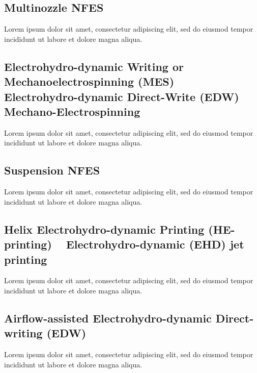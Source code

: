 \documentclass[5p,,preprint,12pt,twocolumn]{elsarticle}
\begin{document}
\subsection{Multinozzle NFES \unskip~\protect\cite{527120:11974322,527120:11974323,527120:11974324}}Lorem ipsum dolor sit amet, consectetur adipiscing elit, sed do eiusmod tempor incididunt ut labore et dolore magna aliqua.



\subsection{Electrohydro-dynamic Writing or Mechanoelectrospinning (MES) \unskip~\protect\cite{527120:11974311} \mbox{}\protect\newline Electrohydro-dynamic Direct-Write (EDW) \unskip~\protect\cite{527120:11974328} \mbox{}\protect\newline Mechano-Electrospinning \unskip~\protect\cite{527120:11974304}}Lorem ipsum dolor sit amet, consectetur adipiscing elit, sed do eiusmod tempor incididunt ut labore et dolore magna aliqua.



\subsection{Suspension NFES \unskip~\protect\cite{527120:12033656}}Lorem ipsum dolor sit amet, consectetur adipiscing elit, sed do eiusmod tempor incididunt ut labore et dolore magna aliqua.



\subsection{Helix Electrohydro-dynamic Printing (HE-printing) \unskip~\protect\cite{527120:11974308} \mbox{}\protect\newline Electrohydro-dynamic (EHD) jet printing \unskip~\protect\cite{527120:11974320}}Lorem ipsum dolor sit amet, consectetur adipiscing elit, sed do eiusmod tempor incididunt ut labore et dolore magna aliqua.



\subsection{Airflow-assisted Electrohydro-dynamic Direct-writing (EDW) \unskip~\protect\cite{527120:11974312}}Lorem ipsum dolor sit amet, consectetur adipiscing elit, sed do eiusmod tempor incididunt ut labore et dolore magna aliqua.
\end{document}
